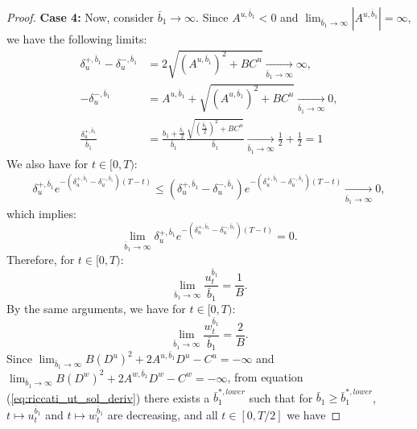 \documentclass[11pt]{article}
\begin{document}
\begin{proof}
	
	
	
	\textbf{Case 4:} Now, consider $\bar{b}_1 \to \infty$.
	Since $A^{u,\bar{b}_1}<0$ and $\lim_{\bar{b}_1 \to \infty} |A^{u,\bar{b}_1}|=\infty$, we have the following limits:
	\begin{equation*}
	\begin{split}
	\delta^{+,\bar{b}_1}_u-\delta^{-,\bar{b}_1}_u&=2 \sqrt{(A^{u,\bar{b}_1})^2+BC^u} \xrightarrow[\bar{b}_1 \to \infty]{}\infty,\\
	-\delta^{-,\bar{b}_1}_u&=A^{u,\bar{b}_1}+\sqrt{(A^{u,\bar{b}_1})^2+BC^u}\xrightarrow[\bar{b}_1 \to \infty]{}0,\\
	\frac{\delta^{+,\bar{b}_1}_u}{\bar{b}_1}&=\frac{b_1+\frac{\bar{b}_1}{2}}{\bar{b}_1} \frac{\sqrt{\left(\frac{\bar{b}_1}{2}\right)^2+BC^u}}{\bar{b}_1}\xrightarrow[\bar{b}_1 \to \infty]{} \frac{1}{2}+\frac{1}{2}=1
	\end{split}
	\end{equation*}
	We also have for $t\in [0,T)$:
	\begin{equation*}
	\begin{split}
	\delta^{+,\bar{b}_1}_ue^{-(\delta^{+,\bar{b}_1}_u-\delta^{-,\bar{b}_1}_u)(T-t)}\leq(\delta^{+,\bar{b}_1}_u-\delta^{-,\bar{b}_1}_u)e^{-(\delta^{+,\bar{b}_1}_u-\delta^{-,\bar{b}_1}_u)(T-t)}
	\xrightarrow[\bar{b}_1 \to \infty]{}0,
	\end{split}
	\end{equation*}
	which implies:
	\begin{equation*}
	\lim_{\bar{b}_1\to \infty}\delta^{+,\bar{b}_1}_ue^{-(\delta^{+,\bar{b}_1}_u-\delta^{-,\bar{b}_1}_u)(T-t)}=0.
	\end{equation*}
	Therefore, for $t \in [0,T)$:
	\begin{equation*}
	\lim_{\bar{b}_1 \to \infty}\frac{u^{\bar{b}_1}_t}{\bar{b}_1}=\frac{1}{B}.
	\end{equation*}
	By the same arguments, we have for $t \in [0,T)$:
	\begin{equation*}
	\lim_{\bar{b}_1 \to \infty}\frac{w^{\bar{b}_1}_t}{\bar{b}_1}=\frac{2}{B}.
	\end{equation*}
	Since $\lim_{\bar{b}_1 \to \infty}B (D^{u})^2 + 2 A^{u,\bar{b}_1} D^{u} - C^{u}=-\infty$ and $\lim_{\bar{b}_1 \to \infty}B (D^{w})^2 + 2 A^{w,\bar{b}_1} D^{w} - C^{w}=-\infty$,   from equation (\ref{eq:riccati_ut_sol_deriv}) there exists a $\bar{b}_1^{*,lower}$ such that for $\bar{b}_1 \geq \bar{b}_1^{*,lower}$, $t \mapsto u_t^{\bar{b}_1}$ and $ t \mapsto w_t^{\bar{b}_1}$ are decreasing, and all $t \in [0, T/2]$ we have

\end{proof}
\end{document}
